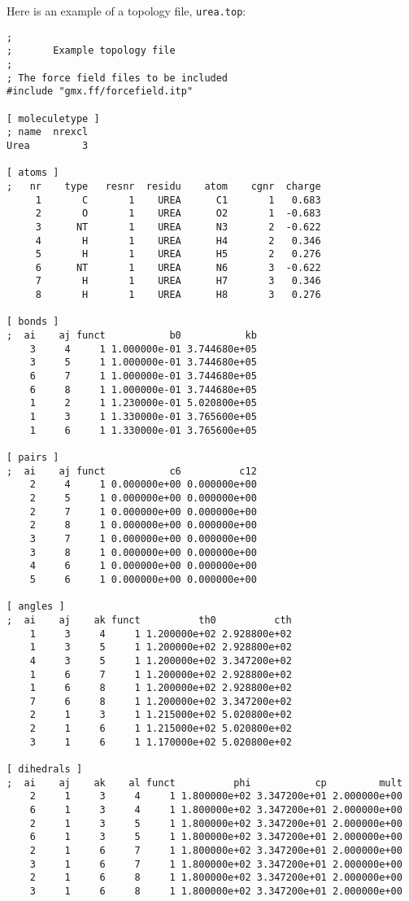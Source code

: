 Here is an example of a topology file, {\tt urea.top}:

{\small
\begin{verbatim}
;
;       Example topology file
;
; The force field files to be included
#include "gmx.ff/forcefield.itp"

[ moleculetype ]
; name  nrexcl
Urea         3

[ atoms ]
;   nr    type   resnr  residu    atom    cgnr  charge
     1       C       1    UREA      C1       1   0.683
     2       O       1    UREA      O2       1  -0.683
     3      NT       1    UREA      N3       2  -0.622
     4       H       1    UREA      H4       2   0.346
     5       H       1    UREA      H5       2   0.276
     6      NT       1    UREA      N6       3  -0.622
     7       H       1    UREA      H7       3   0.346
     8       H       1    UREA      H8       3   0.276

[ bonds ]
;  ai    aj funct           b0           kb
    3     4     1 1.000000e-01 3.744680e+05 
    3     5     1 1.000000e-01 3.744680e+05 
    6     7     1 1.000000e-01 3.744680e+05 
    6     8     1 1.000000e-01 3.744680e+05 
    1     2     1 1.230000e-01 5.020800e+05 
    1     3     1 1.330000e-01 3.765600e+05 
    1     6     1 1.330000e-01 3.765600e+05 

[ pairs ]
;  ai    aj funct           c6          c12
    2     4     1 0.000000e+00 0.000000e+00 
    2     5     1 0.000000e+00 0.000000e+00 
    2     7     1 0.000000e+00 0.000000e+00 
    2     8     1 0.000000e+00 0.000000e+00 
    3     7     1 0.000000e+00 0.000000e+00 
    3     8     1 0.000000e+00 0.000000e+00 
    4     6     1 0.000000e+00 0.000000e+00 
    5     6     1 0.000000e+00 0.000000e+00 

[ angles ]
;  ai    aj    ak funct          th0          cth
    1     3     4     1 1.200000e+02 2.928800e+02 
    1     3     5     1 1.200000e+02 2.928800e+02 
    4     3     5     1 1.200000e+02 3.347200e+02 
    1     6     7     1 1.200000e+02 2.928800e+02 
    1     6     8     1 1.200000e+02 2.928800e+02 
    7     6     8     1 1.200000e+02 3.347200e+02 
    2     1     3     1 1.215000e+02 5.020800e+02 
    2     1     6     1 1.215000e+02 5.020800e+02 
    3     1     6     1 1.170000e+02 5.020800e+02 

[ dihedrals ]
;  ai    aj    ak    al funct          phi           cp         mult
    2     1     3     4     1 1.800000e+02 3.347200e+01 2.000000e+00 
    6     1     3     4     1 1.800000e+02 3.347200e+01 2.000000e+00 
    2     1     3     5     1 1.800000e+02 3.347200e+01 2.000000e+00 
    6     1     3     5     1 1.800000e+02 3.347200e+01 2.000000e+00 
    2     1     6     7     1 1.800000e+02 3.347200e+01 2.000000e+00 
    3     1     6     7     1 1.800000e+02 3.347200e+01 2.000000e+00 
    2     1     6     8     1 1.800000e+02 3.347200e+01 2.000000e+00 
    3     1     6     8     1 1.800000e+02 3.347200e+01 2.000000e+00 


\end{verbatim}}

